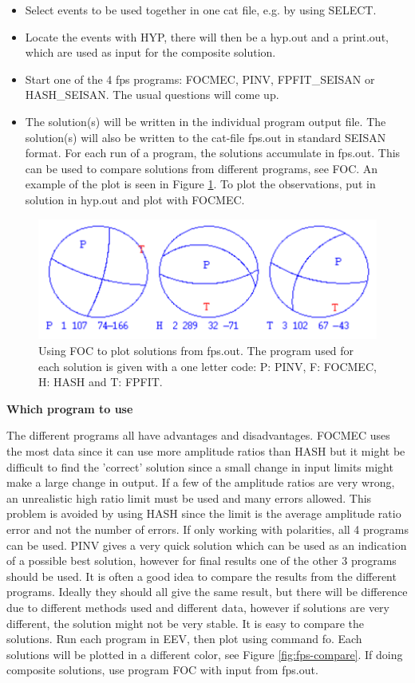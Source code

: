 \begin{itemize}
\item Select events to be used together in one cat file, e.g. by using SELECT.
\item
Locate the events with HYP, there will then be a hyp.out and a print.out, which are used as input for the composite solution.
\item Start one of the 4 fps programs: FOCMEC, PINV, FPFIT\_SEISAN or HASH\_SEISAN. The usual questions will come up. 
\item The solution(s) will be written in the individual program output file. The solution(s) will also be written to the cat-file fps.out in standard SEISAN format. For each run of a program, the solutions accumulate in fps.out. This can be used to compare solutions from different programs, see FOC. An example of the plot is seen in Figure \ref{fig:foc}. To plot the observations, put in solution
in hyp.out and plot with FOCMEC.
\end{itemize}
 
\begin{figure}
\centerline{\includegraphics[width=0.9\linewidth]{fig/foc}}
\caption{Using FOC to plot solutions from fps.out. The program used 
for each solution is given with a one letter code: P: PINV, F: FOCMEC, H: HASH and T: FPFIT.}
\label{fig:foc}
\end{figure}


\textbf{Which program to use}

The different programs all have advantages and disadvantages. FOCMEC uses the most data since it can use more amplitude ratios than HASH but it might be difficult to find the 'correct' solution since a small change in input limits might make a large change in output. If a few of the amplitude ratios are very wrong, an unrealistic high ratio limit must be used and many errors allowed. This problem is avoided by using HASH since the limit is the average amplitude ratio error and not the number of errors. If only working with polarities, all 4 programs can be used. PINV gives a very quick solution which can be used as an indication of a possible best solution, however for final results one of the other 3 programs should be used. It is often a good idea to compare the results from the different programs. Ideally they should all give the same result, but there will be difference due to different methods used and different data, however if solutions are very different, the solution might not be very stable. It is easy to compare the solutions. Run each program in EEV, then plot using command fo. Each solutions will be plotted in a different color, see Figure \ref{fig:fps-compare}. If doing composite solutions, use program FOC with input from fps.out. 

